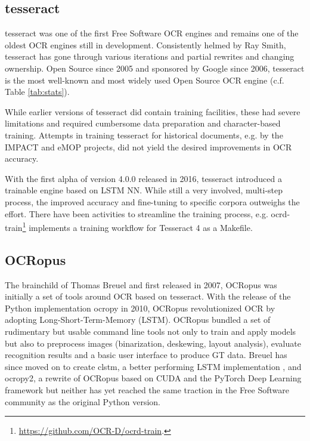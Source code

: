 \documentclass[conference]{IEEEtran}
\begin{document}
\subsection{tesseract}

tesseract \cite{4376991} was one of the first Free Software OCR
engines \cite{Rice1995TheFA} and remains one of the oldest OCR engines still in
development. Consistently helmed by Ray Smith, tesseract has gone
through various iterations and partial rewrites and changing
ownership. Open Source since 2005 and sponsored by Google since
2006, tesseract is the most well-known and most widely used Open
Source OCR engine (c.f. Table \ref{tab:stats}).

While earlier versions of tesseract did contain training facilities, 
these had severe limitations and required cumbersome data preparation and
character-based training. Attempts in training tesseract for historical documents, e.g.
by the IMPACT \cite{PSNC} and eMOP \cite{doi:10.1093/llc/fqv062} projects, did not yield 
the desired improvements in OCR accuracy.

With the first alpha of version 4.0.0 released in 2016, tesseract introduced a trainable
engine based on LSTM NN.\cite{smith2016tesseract} While still a very involved, multi-step process, the
improved accuracy and fine-tuning to specific corpora outweighs the effort.
There have been activities to streamline the training process, e.g.
ocrd-train\footnote{\url{https://github.com/OCR-D/ocrd-train}.} implements a training workflow for
Tesseract 4 as a Makefile.

\subsection{OCRopus}

The brainchild of Thomas Breuel and first released in 2007, OCRopus
\cite{breuel} was initially a set of tools around OCR based on
tesseract. With the release of the Python implementation ocropy in
2010, OCRopus revolutionized OCR by adopting
Long-Short-Term-Memory (LSTM). OCRopus bundled a set of rudimentary but
usable command line tools not only to train and apply models but
also to preprocess images (binarization, deskewing, layout analysis),
evaluate recognition results and a basic user interface to produce
GT data. Breuel has since moved on to create clstm, a better
performing LSTM implementation \cite{DBLP:conf/icdar/Breuel17}, and
ocropy2, a rewrite of OCRopus based on CUDA and the PyTorch Deep
Learning framework \cite{DBLP:conf/icdar/Breuel17} but neither has
yet reached the same traction in the Free Software community as the
original Python version.
\end{document}

